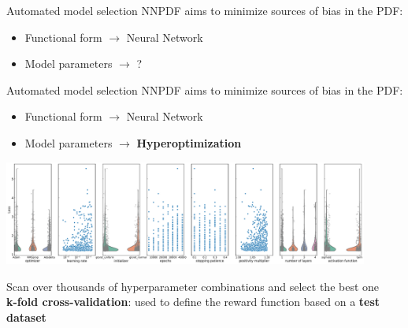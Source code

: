\documentclass[aspectratio=169,9pt]{beamer}
\begin{document}
\begin{frame}[t]{Automated model selection}
	NNPDF aims to minimize sources of bias in the PDF:
	\begin{itemize}
	    \item Functional form $\rightarrow$ Neural Network
	    \item Model parameters $\rightarrow$ ?
	\end{itemize}
\end{frame}


\begin{frame}[t]{Automated model selection}
	NNPDF aims to minimize sources of bias in the PDF:
	\begin{itemize}
	    \item Functional form $\rightarrow$ Neural Network
	    \item Model parameters $\rightarrow$ \textbf{Hyperoptimization}
	\end{itemize}
	\begin{center}
	    \includegraphics[width=0.9\textwidth]{hyperopt_scan}
	\end{center}
    Scan over thousands of hyperparameter combinations and select the best one \\
    {\bf k-fold cross-validation}: used to define the reward function based on a {\bf test dataset}
\end{frame}


\end{document}
